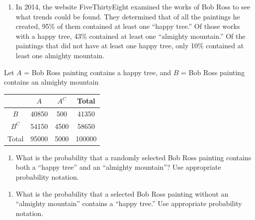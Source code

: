 \documentclass[
]{report}
\providecommand{\tightlist}{%
  \setlength{\itemsep}{0pt}\setlength{\parskip}{0pt}}
\begin{document}
\begin{enumerate}
\def\labelenumi{\arabic{enumi}.}
\tightlist
\item
  In 2014, the website FiveThirtyEight examined the works of Bob Ross to see what trends could be found. They determined that of all the paintings he created, 95\% of them contained at least one ``happy tree.'' Of those works with a happy tree, 43\% contained at least one ``almighty mountain.'' Of the paintings that did not have at least one happy tree, only 10\% contained at least one almighty mountain.
  \vspace{1mm}
\end{enumerate}

Let \(A\) = Bob Ross painting contains a happy tree, and \(B\) = Bob Ross painting contains an almighty mountain
\vspace{0.1in}

\begin{center}
\begin{tabular}{|c|c|c|c|} \hline
\hspace{0.8in} & \hspace{0.25in}  $A$ \hspace{.25in} & \hspace{0.25in} $A^C$ \hspace{0.25in} & \hspace{0.25in} Total \hspace{0.25in} \\ \hline
 $B$ & 40850 & 500 & 41350 \\ \hline
 $B^C$ & 54150 & 4500 & 58650 \\ \hline
Total & 95000 & 5000 & 100000 \\ \hline
\end{tabular}
\end{center}
\vspace{.1in}

\begin{enumerate}
\def\labelenumi{\alph{enumi}.}
\tightlist
\item
  What is the probability that a randomly selected Bob Ross painting contains both a ``happy tree'' and an ``almighty mountain''? Use appropriate probability notation.
\end{enumerate}

\vspace{0.5in}

\begin{enumerate}
\def\labelenumi{\alph{enumi}.}
\setcounter{enumi}{1}
\tightlist
\item
  What is the probability that a selected Bob Ross painting without an ``almighty mountain'' contains a ``happy tree.'' Use appropriate probability notation.
\end{enumerate}
\end{document}
